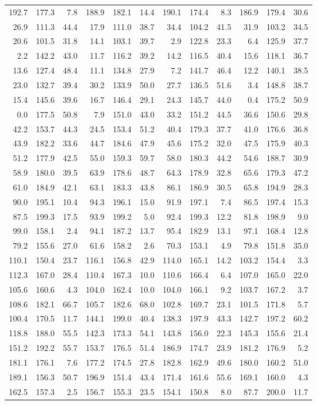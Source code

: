 \documentclass[draft]{article}
\begin{document}
\begin{center}
\begin{tabular}{rrrrrrrrrrrr}
192.7&177.3&  7.8&188.9&182.1& 14.4&190.1&174.4&  8.3&186.9&179.4& 30.6\\
 26.9&111.3& 44.4& 17.9&111.0& 38.7& 34.4&104.2& 41.5& 31.9&103.2& 34.5\\
 20.6&101.5& 31.8& 14.1&103.1& 39.7&  2.9&122.8& 23.3&  6.4&125.9& 37.7\\
  2.2&142.2& 43.0& 11.7&116.2& 39.2& 14.2&116.5& 40.4& 15.6&118.1& 36.7\\
 13.6&127.4& 48.4& 11.1&134.8& 27.9&  7.2&141.7& 46.4& 12.2&140.1& 38.5\\
 23.0&132.7& 39.4& 30.2&133.9& 50.0& 27.7&136.5& 51.6&  3.4&148.8& 38.7\\
 15.4&145.6& 39.6& 16.7&146.4& 29.1& 24.3&145.7& 44.0&  0.4&175.2& 50.9\\
  0.0&177.5& 50.8&  7.9&151.0& 43.0& 33.2&151.2& 44.5& 36.6&150.6& 29.8\\
 42.2&153.7& 44.3& 24.5&153.4& 51.2& 40.4&179.3& 37.7& 41.0&176.6& 36.8\\
 43.9&182.2& 33.6& 44.7&184.6& 47.9& 45.6&175.2& 32.0& 47.5&175.9& 40.3\\
 51.2&177.9& 42.5& 55.0&159.3& 59.7& 58.0&180.3& 44.2& 54.6&188.7& 30.9\\
 58.9&180.0& 39.5& 63.9&178.6& 48.7& 64.3&178.9& 32.8& 65.6&179.3& 47.2\\
 61.0&184.9& 42.1& 63.1&183.3& 43.8& 86.1&186.9& 30.5& 65.8&194.9& 28.3\\
 90.0&195.1& 10.4& 94.3&196.1& 15.0& 91.9&197.1&  7.4& 86.5&197.4& 15.3\\
 87.5&199.3& 17.5& 93.9&199.2&  5.0& 92.4&199.3& 12.2& 81.8&198.9&  9.0\\
 99.0&158.1&  2.4& 94.1&187.2& 13.7& 95.4&182.9& 13.1& 97.1&168.4& 12.8\\
 79.2&155.6& 27.0& 61.6&158.2&  2.6& 70.3&153.1&  4.9& 79.8&151.8& 35.0\\
110.1&150.4& 23.7&116.1&156.8& 42.9&114.0&165.1& 14.2&103.2&154.4&  3.3\\
112.3&167.0& 28.4&110.4&167.3& 10.0&110.6&166.4&  6.4&107.0&165.0& 22.0\\
105.6&160.6&  4.3&104.0&162.4& 10.0&104.0&166.1&  9.2&103.7&167.2&  3.7\\
108.6&182.1& 66.7&105.7&182.6& 68.0&102.8&169.7& 23.1&101.5&171.8&  5.7\\
100.4&170.5& 11.7&144.1&199.0& 40.4&138.3&197.9& 43.3&142.7&197.2& 60.2\\
118.8&188.0& 55.5&142.3&173.3& 54.1&143.8&156.0& 22.3&145.3&155.6& 21.4\\
151.2&192.2& 55.7&153.7&176.5& 51.4&186.9&174.7& 23.9&181.2&176.9&  5.2\\
181.1&176.1&  7.6&177.2&174.5& 27.8&182.8&162.9& 49.6&180.0&160.2& 51.0\\
189.1&156.3& 50.7&196.9&151.4& 43.4&171.4&161.6& 55.6&169.1&160.0&  4.3\\
162.5&157.3&  2.5&156.7&155.3& 23.5&154.1&150.8&  8.0& 87.7&200.0& 11.7\\
\hline
\end{tabular}
\end{center}
\normalsize
\clearpage
\end{document}

